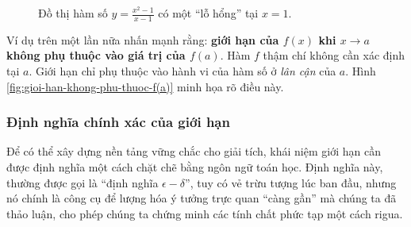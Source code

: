 \begin{figure}[H]
    \centering
    \caption{Đồ thị hàm số $y=\frac{x^2-1}{x-1}$ có một ``lỗ hổng'' tại $x=1$.\footnotemark}
    \label{fig:gioi-han-lo-hong}
\end{figure}

Ví dụ trên một lần nữa nhấn mạnh rằng: \textbf{giới hạn của $f(x)$ khi $x \to a$ không phụ thuộc vào giá trị của $f(a)$}. Hàm $f$ thậm chí không cần xác định tại $a$. Giới hạn chỉ phụ thuộc vào hành vi của hàm số ở \textit{lân cận} của $a$. Hình \ref{fig:gioi-han-khong-phu-thuoc-f(a)} minh họa rõ điều này.



\subsubsection{Định nghĩa chính xác của giới hạn}

Để có thể xây dựng nền tảng vững chắc cho giải tích, khái niệm giới hạn cần được định nghĩa một cách chặt chẽ bằng ngôn ngữ toán học. Định nghĩa này, thường được gọi là ``định nghĩa $\epsilon-\delta$'', tuy có vẻ trừu tượng lúc ban đầu, nhưng nó chính là công cụ để lượng hóa ý tưởng trực quan ``càng gần'' mà chúng ta đã thảo luận, cho phép chúng ta chứng minh các tính chất phức tạp một cách rigua.


